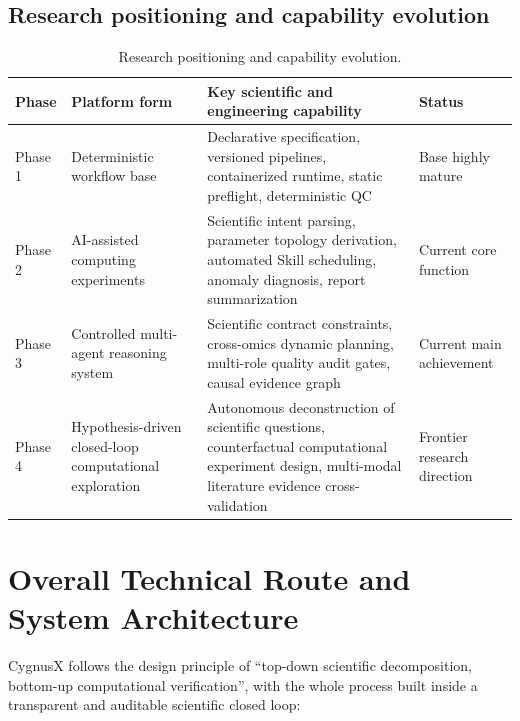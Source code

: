 \documentclass[11pt,a4paper]{article}
\begin{document}
\subsection{Research positioning and capability evolution}

\begin{table}[htbp]
\centering
\renewcommand{\arraystretch}{1.25}
\begin{tabularx}{\textwidth}{p{}p{}X p{}}
\toprule
\textbf{Phase} & \textbf{Platform form} & \textbf{Key scientific and engineering capability} & \textbf{Status}\\
\midrule
Phase 1 & Deterministic workflow base & Declarative specification, versioned pipelines, containerized runtime, static preflight, deterministic QC & Base highly mature\\
Phase 2 & AI-assisted computing experiments & Scientific intent parsing, parameter topology derivation, automated Skill scheduling, anomaly diagnosis, report summarization & Current core function\\
Phase 3 & Controlled multi-agent reasoning system & Scientific contract constraints, cross-omics dynamic planning, multi-role quality audit gates, causal evidence graph & Current main achievement\\
Phase 4 & Hypothesis-driven closed-loop computational exploration & Autonomous deconstruction of scientific questions, counterfactual computational experiment design, multi-modal literature evidence cross-validation & Frontier research direction\\
\bottomrule
\end{tabularx}
\caption{Research positioning and capability evolution.}
\end{table}

\section{Overall Technical Route and System Architecture}

CygnusX follows the design principle of ``top-down scientific decomposition, bottom-up computational verification'', with the whole process built inside a transparent and auditable scientific closed loop:
\end{document}
